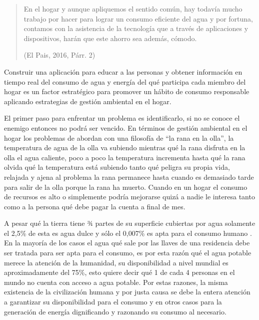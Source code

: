 \documentclass[a4paper,man,natbib]{apa6}
\begin{document}
\begin{quote}
    \vspace{5pt}
    {\small
    En el hogar y aunque apliquemos el sentido común, hay todavía mucho trabajo por hacer para lograr un consumo eficiente del agua y por fortuna, contamos con la asistencia de la tecnología que a través de aplicaciones y dispositivos, harán que este ahorro sea además, cómodo.
    }
    \begin{flushright}
        (El Pais, 2016, Párr. 2)
    \end{flushright}

\end{quote}

Construir una aplicación para educar a las personas y obtener información en tiempo real del consumo de agua y energía del qué participa cada miembro del hogar es un factor estratégico para promover un hábito de consumo responsable aplicando estrategias de gestión ambiental en el hogar.\newline

El primer paso para enfrentar un problema es identificarlo, si no se conoce el enemigo entonces no podrá ser vencido. En términos de gestión ambiental en el hogar los problemas de abordan con una filosofía de “la rana en la olla”,  la temperatura de agua de la olla va subiendo mientras qué la rana disfruta en la olla el agua caliente, poco a poco la temperatura incrementa hasta qué la rana olvida qué la temperatura está subiendo tanto qué peligra su propia vida, relajada y ajena al problema la rana permanece hasta cuando es demasiado tarde para salir de la olla porque la rana ha muerto. Cuando en un hogar el consumo de recursos es alto o simplemente podría mejorarse quizá a nadie le interesa tanto como a la persona qué debe pagar la cuenta a final de mes.\newline

A pesar qué la tierra tiene ¾ partes de su superficie cubiertas por agua solamente el 2,5\% de esta es agua dulce y sólo el 0,007\% es apta para el consumo humano \citep{Aguaenel98:online}. En la mayoría de los casos el agua qué sale por las llaves de una residencia debe ser tratada para ser apta para el consumo, es por esta razón qué el agua potable merece la atención de la humanidad, su disponibilidad a nivel mundial es aproximadamente del 75\%, \citep{Milesdem41:online} esto quiere decir qué 1 de cada 4 personas en el mundo no cuenta con acceso a agua potable. Por estas razones, la misma existencia de la civilización humana y por justa causa se debe la entera atención a garantizar su disponibilidad para el consumo y en otros casos para la generación de energía dignificando y razonando su consumo al necesario.\newline
\end{document}
